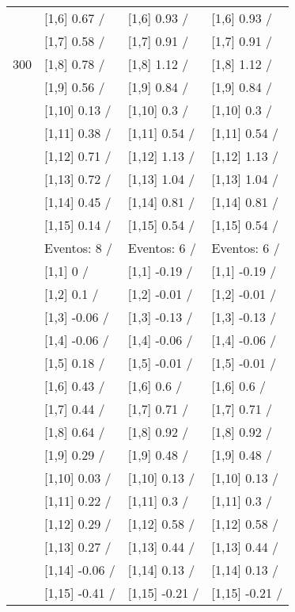 \begin{table}
\begin{tabular}[t]{llll}
 & {}[1,6] 0.67  / & {}[1,6] 0.93  / & {}[1,6] 0.93  /\\
 & {}[1,7] 0.58  / & {}[1,7] 0.91  / & {}[1,7] 0.91  /\\
300 & {}[1,8] 0.78  / & {}[1,8] 1.12  / & {}[1,8] 1.12  /\\
\addlinespace
 & {}[1,9] 0.56  / & {}[1,9] 0.84  / & {}[1,9] 0.84  /\\
 & {}[1,10] 0.13  / & {}[1,10] 0.3  / & {}[1,10] 0.3  /\\
 & {}[1,11] 0.38  / & {}[1,11] 0.54  / & {}[1,11] 0.54  /\\
 & {}[1,12] 0.71  / & {}[1,12] 1.13  / & {}[1,12] 1.13  /\\
 & {}[1,13] 0.72  / & {}[1,13] 1.04  / & {}[1,13] 1.04  /\\
\addlinespace
 & {}[1,14] 0.45  / & {}[1,14] 0.81  / & {}[1,14] 0.81  /\\
 & {}[1,15] 0.14  / & {}[1,15] 0.54  / & {}[1,15] 0.54  /\\
 & Eventos:  8 / & Eventos:  6 / & Eventos:  6 /\\
 & {}[1,1] 0  / & {}[1,1] -0.19  / & {}[1,1] -0.19  /\\
 & {}[1,2] 0.1  / & {}[1,2] -0.01  / & {}[1,2] -0.01  /\\
\addlinespace
 & {}[1,3] -0.06  / & {}[1,3] -0.13  / & {}[1,3] -0.13  /\\
 & {}[1,4] -0.06  / & {}[1,4] -0.06  / & {}[1,4] -0.06  /\\
 & {}[1,5] 0.18  / & {}[1,5] -0.01  / & {}[1,5] -0.01  /\\
 & {}[1,6] 0.43  / & {}[1,6] 0.6  / & {}[1,6] 0.6  /\\
 & {}[1,7] 0.44  / & {}[1,7] 0.71  / & {}[1,7] 0.71  /\\
\addlinespace
500 & {}[1,8] 0.64  / & {}[1,8] 0.92  / & {}[1,8] 0.92  /\\
 & {}[1,9] 0.29  / & {}[1,9] 0.48  / & {}[1,9] 0.48  /\\
 & {}[1,10] 0.03  / & {}[1,10] 0.13  / & {}[1,10] 0.13  /\\
 & {}[1,11] 0.22  / & {}[1,11] 0.3  / & {}[1,11] 0.3  /\\
 & {}[1,12] 0.29  / & {}[1,12] 0.58  / & {}[1,12] 0.58  /\\
\addlinespace
 & {}[1,13] 0.27  / & {}[1,13] 0.44  / & {}[1,13] 0.44  /\\
 & {}[1,14] -0.06  / & {}[1,14] 0.13  / & {}[1,14] 0.13  /\\
 & {}[1,15] -0.41  / & {}[1,15] -0.21  / & {}[1,15] -0.21  /\\
\bottomrule
\end{tabular}
\end{table}
